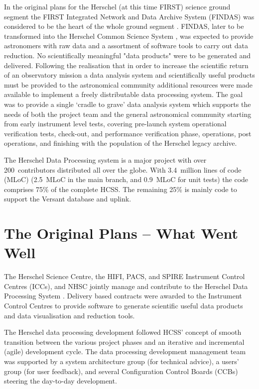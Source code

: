 In the original plans for the Herschel (at this time FIRST) science ground segment the FIRST Integrated Network and Data Archive System (FINDAS) was considered to be the heart of the whole ground segment \citep{bauer98}. FINDAS, later to be transformed into the Herschel Common Science System \citep[HCSS]{Riedinger09}, was expected to provide astronomers with raw data and a assortment of software tools to carry out data reduction. No scientifically meaningful "data products" were to be generated and delivered. Following the realisation that in order to increase the scientific return of an observatory mission a data analysis system and scientifically useful products must be provided to the astronomical community additional resources were made available to implement a freely distributable data processing system. The goal was to provide a single `cradle to grave' data analysis system which supports the needs of both the project team and the general astronomical community starting from early instrument level tests, covering pre-launch system operational verification tests, check-out, and performance verification phase, operations, post operations, and finishing with the population of the Herschel legacy archive.

The Herschel Data Processing system is a major project with over 200~contributors distributed all over the globe. With 3.4~million lines of code (MLoC) (2.5~MLoC in the main branch, and 0.9~MLoC for unit tests) the code comprises 75\% of the complete HCSS. The remaining 25\% is mainly code to support the Versant database and uplink.

\section{The Original Plans -- What Went Well}
The Herschel Science Centre, the HIFI, PACS, and SPIRE Instrument Control Centres (ICCs), and NHSC jointly manage and contribute to the Herschel Data Processing System \citep{ott10}. Delivery based contracts were awarded to the Instrument Control Centres to provide software to generate scientific useful data products and data visualisation and reduction tools.

The Herschel data processing development followed HCSS' concept of smooth transition between the various project phases and an iterative and incremental (agile) development cycle. The data processing development management team was supported by a system architecture group (for technical advice), a users' group (for user feedback), and several Configuration Control Boards (CCBs) steering the day-to-day development.

